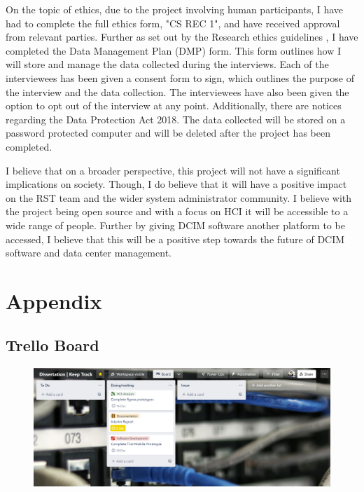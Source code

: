 \documentclass [11pt,a4paper]{article}
\begin{document}
On the topic of ethics, due to the project involving human participants, I have had to complete the full ethics form, "CS REC 1", and have received approval from relevant parties. Further as set out by the Research ethics guidelines \cite{ethicsguidelines}, I have completed the Data Management Plan (DMP) form. This form outlines how I will store and manage the data collected during the interviews. Each of the interviewees has been given a consent form to sign, which outlines the purpose of the interview and the data collection. The interviewees have also been given the option to opt out of the interview at any point. Additionally, there are notices regarding the Data Protection Act 2018. The data collected will be stored on a password protected computer and will be deleted after the project has been completed.

I believe that on a broader perspective, this project will not have a significant implications on society. Though, I do believe that it will have a positive impact on the RST team and the wider system administrator community. I believe with the project being open source and with a focus on HCI it will be accessible to a wide range of people. Further by giving DCIM software another platform to be accessed, I believe that this will be a positive step towards the future of DCIM software and data center management.

\pagebreak

 

\appendix
\section{Appendix}
\label{sec:appendix}
\subsection{Trello Board}
\label{sec:trello_board}
\begin{figure}[ht]
    \centering
    \includegraphics[width=1\textwidth]{images/trello-board.png}
\end{figure}
\end{document}
